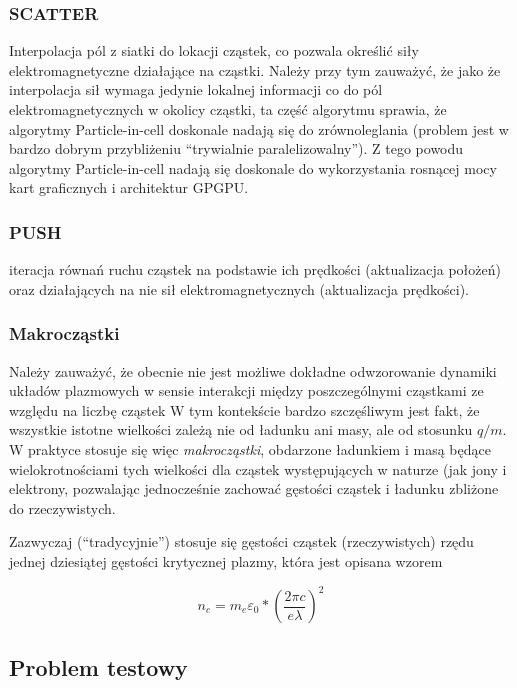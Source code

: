 \subsubsection{SCATTER}
    Interpolacja pól z siatki do lokacji cząstek, co pozwala określić siły elektromagnetyczne działające na cząstki.
    Należy przy tym zauważyć, że jako że interpolacja sił wymaga jedynie lokalnej informacji co do pól
    elektromagnetycznych w okolicy cząstki, ta część algorytmu sprawia, że algorytmy Particle-in-cell doskonale
    nadają się do zrównoleglania (problem jest w bardzo dobrym przybliżeniu ``trywialnie paralelizowalny''). Z tego powodu algorytmy
    Particle-in-cell nadają się doskonale do wykorzystania rosnącej mocy kart graficznych i architektur GPGPU.
\subsubsection{PUSH}
    iteracja równań ruchu cząstek na podstawie ich prędkości (aktualizacja położeń)
    oraz działających na nie sił elektromagnetycznych (aktualizacja prędkości).

\subsubsection{Makrocząstki}
Należy zauważyć, że obecnie nie jest możliwe dokładne odwzorowanie dynamiki układów plazmowych w sensie interakcji
między poszczególnymi cząstkami ze względu na liczbę cząstek %
W tym kontekście bardzo szczęśliwym jest fakt, że wszystkie istotne wielkości zależą nie od ładunku ani masy,
ale od stosunku $q/m$. W praktyce stosuje się więc \emph{makrocząstki}, obdarzone ładunkiem i masą będące wielokrotnościami
tych wielkości dla cząstek występujących w naturze (jak jony i elektrony, pozwalając jednocześnie zachować gęstości
cząstek i ładunku %
zbliżone do rzeczywistych.

Zazwyczaj (``tradycyjnie'') stosuje się gęstości cząstek (rzeczywistych) rzędu jednej dziesiątej gęstości krytycznej plazmy,
która jest opisana wzorem

\begin{equation}
    n_c = m_e \varepsilon_0 * (\frac{2 \pi c}{e \lambda})^2
    \label{eqn:critical-density}
\end{equation}

\subsection{Problem testowy}

